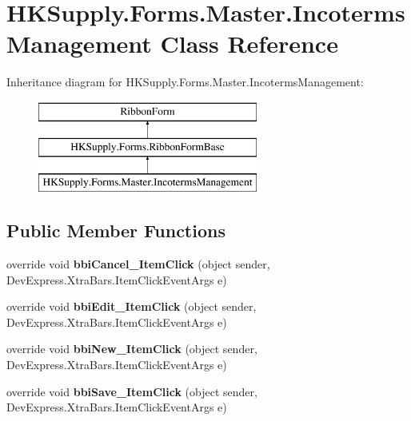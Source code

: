 \hypertarget{class_h_k_supply_1_1_forms_1_1_master_1_1_incoterms_management}{}\section{H\+K\+Supply.\+Forms.\+Master.\+Incoterms\+Management Class Reference}
\label{class_h_k_supply_1_1_forms_1_1_master_1_1_incoterms_management}
Inheritance diagram for H\+K\+Supply.\+Forms.\+Master.\+Incoterms\+Management\+:\begin{figure}[H]
\begin{center}
\leavevmode
\includegraphics[height=3.000000cm]{class_h_k_supply_1_1_forms_1_1_master_1_1_incoterms_management}
\end{center}
\end{figure}
\subsection*{Public Member Functions}
\begin{DoxyCompactItemize}
\item 
\mbox{\label{class_h_k_supply_1_1_forms_1_1_master_1_1_incoterms_management_a78a4325583ba2ef18a90eb8a94c32916}} 
override void {\bfseries bbi\+Cancel\+\_\+\+Item\+Click} (object sender, Dev\+Express.\+Xtra\+Bars.\+Item\+Click\+Event\+Args e)
\item 
\mbox{\label{class_h_k_supply_1_1_forms_1_1_master_1_1_incoterms_management_a8932d7f508aa41b13d3b169a9762a99f}} 
override void {\bfseries bbi\+Edit\+\_\+\+Item\+Click} (object sender, Dev\+Express.\+Xtra\+Bars.\+Item\+Click\+Event\+Args e)
\item 
\mbox{\label{class_h_k_supply_1_1_forms_1_1_master_1_1_incoterms_management_a6a53f2bf9723ca70abaf9aae726c2120}} 
override void {\bfseries bbi\+New\+\_\+\+Item\+Click} (object sender, Dev\+Express.\+Xtra\+Bars.\+Item\+Click\+Event\+Args e)
\item 
\mbox{\label{class_h_k_supply_1_1_forms_1_1_master_1_1_incoterms_management_a33ec60fd099819e0b0e7aac2b32bd32e}} 
override void {\bfseries bbi\+Save\+\_\+\+Item\+Click} (object sender, Dev\+Express.\+Xtra\+Bars.\+Item\+Click\+Event\+Args e)
\end{DoxyCompactItemize}

